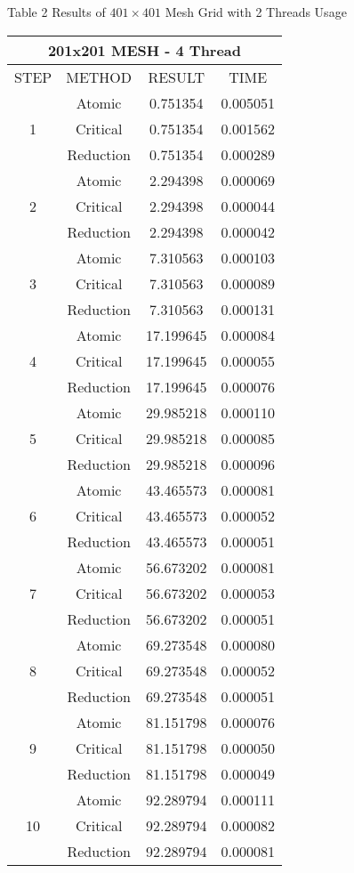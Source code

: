 \documentclass[10pt]{article}
\begin{document}
Table 2 Results of $401 \times 401$ Mesh Grid with 2 Threads Usage

\begin{center}
\begin{tabular}{|c|c|c|c|}
\hline
\multicolumn{4}{|c|}{201x201 MESH - 4 Thread} \\
\hline
STEP & METHOD & RESULT & TIME \\
\hline
\multirow[t]{3}{*}{1} & Atomic & 0.751354 & 0.005051 \\
\hline
 & Critical & 0.751354 & 0.001562 \\
\hline
 & Reduction & 0.751354 & 0.000289 \\
\hline
\multirow[t]{3}{*}{2} & Atomic & 2.294398 & 0.000069 \\
\hline
 & Critical & 2.294398 & 0.000044 \\
\hline
 & Reduction & 2.294398 & 0.000042 \\
\hline
\multirow[t]{3}{*}{3} & Atomic & 7.310563 & 0.000103 \\
\hline
 & Critical & 7.310563 & 0.000089 \\
\hline
 & Reduction & 7.310563 & 0.000131 \\
\hline
\multirow[t]{3}{*}{4} & Atomic & 17.199645 & 0.000084 \\
\hline
 & Critical & 17.199645 & 0.000055 \\
\hline
 & Reduction & 17.199645 & 0.000076 \\
\hline
\multirow[t]{3}{*}{5} & Atomic & 29.985218 & 0.000110 \\
\hline
 & Critical & 29.985218 & 0.000085 \\
\hline
 & Reduction & 29.985218 & 0.000096 \\
\hline
\multirow[t]{3}{*}{6} & Atomic & 43.465573 & 0.000081 \\
\hline
 & Critical & 43.465573 & 0.000052 \\
\hline
 & Reduction & 43.465573 & 0.000051 \\
\hline
\multirow[t]{3}{*}{7} & Atomic & 56.673202 & 0.000081 \\
\hline
 & Critical & 56.673202 & 0.000053 \\
\hline
 & Reduction & 56.673202 & 0.000051 \\
\hline
\multirow[t]{3}{*}{8} & Atomic & 69.273548 & 0.000080 \\
\hline
 & Critical & 69.273548 & 0.000052 \\
\hline
 & Reduction & 69.273548 & 0.000051 \\
\hline
\multirow[t]{3}{*}{9} & Atomic & 81.151798 & 0.000076 \\
\hline
 & Critical & 81.151798 & 0.000050 \\
\hline
 & Reduction & 81.151798 & 0.000049 \\
\hline
\multirow[t]{3}{*}{10} & Atomic & 92.289794 & 0.000111 \\
\hline
 & Critical & 92.289794 & 0.000082 \\
\hline
 & Reduction & 92.289794 & 0.000081 \\
\hline
\end{tabular}
\end{center}
\end{document}
